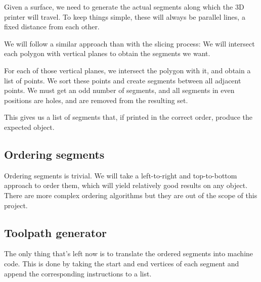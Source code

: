 Given a surface, we need to generate the actual segments along which the 3D printer will travel. To keep things simple, these will always be parallel lines, a fixed distance from each other.

We will follow a similar approach than with the slicing process: We will intersect each polygon with vertical planes to obtain the segments we want.

For each of those vertical planes, we intersect the polygon with it, and obtain a list of points. We sort these points and create segments between all adjacent points. We must get an odd number of segments, and all segments in even positions are holes, and are removed from the resulting set.

This gives us a list of segments that, if printed in the correct order, produce the expected object.


\subsection{Ordering segments}
Ordering segments is trivial. We will take a left-to-right and top-to-bottom approach to order them, which will yield relatively good results on any object. There are more complex ordering algorithms but they are out of the scope of this project.

\subsection{Toolpath generator}

The only thing that's left now is to translate the ordered segments into machine code. This is done by taking the start and end vertices of each segment and append the corresponding instructions to a list.







